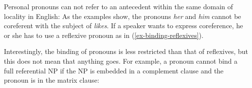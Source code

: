 \documentclass[output=paper
 	        ,biblatex
                ,babelshorthands
                ,newtxmath
                ,draftmode
                ,colorlinks, citecolor=brown
]{langscibook}
\begin{document}
Personal pronouns can not refer to an antecedent within the same domain of locality in English:
\eal
{}
\zl
As the examples show, the pronouns \emph{her} and \emph{him} cannot be coreferent with the subject
of \emph{likes}. If a speaker wants to express coreference, he or she has to use a reflexive pronoun
as in (\ref{ex-binding-reflexives}). 

Interestingly, the binding of pronouns is less restricted than that of reflexives, but this does
not mean that anything goes. For example, a pronoun cannot bind a full referential NP if the NP is
embedded in a complement clause and the pronoun is in the matrix clause:
\eal
\label{ex-he-thinks-that-Peter}
\zl  
\end{document}
